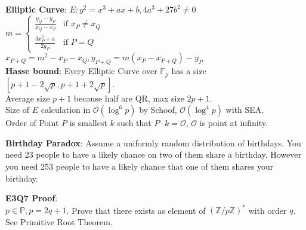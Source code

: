 \documentclass[10pt]{article}
\begin{document}
\begin{multicols}{2}
        \noindent
        \textbf{Elliptic Curve}: $E:y^2=x^3+ax+b,4a^3+27b^2\neq0$\\
    $m=\begin{cases}
        \frac{y_Q-y_P}{x_Q-x_P} & \text{if } x_P\neq x_Q \\
        \frac{3x_P^2+a}{2y_P}   & \text{if } P=Q
    \end{cases}$\\
    $x_{P+Q}=m^2-x_P-x_Q,y_{P+Q}=m(x_P-x_{P+Q})-y_P$\\
        \textbf{Hasse bound}: Every Elliptic Curve over $\mathbb{F}_p$ has a size\\ $[p+1-2\sqrt{p},p+1+2\sqrt{p}]$. \\ Average size $p+1$ because half are QR, max size $2p+1$.\\
        Size of $E$ calculation in $\mathcal{O}(\log^6 p)$ by Schoof, $\mathcal{O}(\log^4 p)$ with SEA.\\
        Order of Point $P$ is smallest $k$ such that $P\cdot k = \mathcal{O}$, $\mathcal{O}$ is point at infinity.

        \noindent
        \textbf{Birthday Paradox}: Assume a uniformly random distribution of birthdays. You need 23 people to have a likely chance on two of them share a birthday. However you need 253 people to have a likely chance that one of them shares your birthday.

        \noindent
        \textbf{E3Q7 Proof}:\\
    $p\in\mathbb{P},p=2q+1$. Prove that there exists as element of $(\mathbb{Z}/p\mathbb{Z})^*$ with order $q$.\\
    See Primitive Root Theorem.
\end{multicols}
\end{document}
